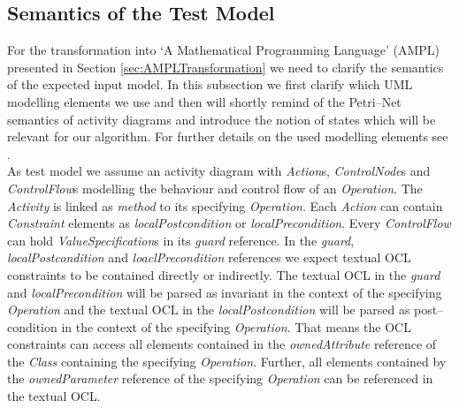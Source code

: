 \documentclass[runningheads,a4paper]{llncs}%
\newcommand{\UMLType}[1]{\textsf{\textit{#1}}} %
\newcommand{\UMLReference}[1]{\textsf{\textit{#1}}} %
\begin{document}
\subsection{Semantics of the Test Model}%
For the transformation into `A Mathematical Programming Language' (AMPL) presented in Section \ref{sec:AMPLTransformation} we need to clarify the semantics of the expected input model. In this subsection we first clarify which UML modelling elements we use and then will shortly remind of the Petri--Net semantics of activity diagrams and introduce the notion of states which will be relevant for our algorithm. For further details on the used modelling elements see \cite{UML23Superstructure}.\\%
As test model we assume an activity diagram with \UMLType{Action}s, \UMLType{ControlNode}s and \UMLType{ControlFlow}s modelling the behaviour and control flow of an \UMLType{Operation}. The \UMLType{Activity} is linked as \UMLReference{method} to its specifying \UMLType{Operation}. Each \UMLType{Action} can contain %
\UMLType{Constraint} %
elements as \UMLReference{localPostcondition} or \UMLReference{localPrecondition}. Every \UMLType{ControlFlow} can hold %
\UMLType{ValueSpecification}s%
in its \UMLReference{guard} reference. In the \UMLReference{guard}, \UMLReference{localPostcondition} and \UMLReference{loaclPrecondition} references we expect textual OCL constraints to be contained directly or indirectly. The textual OCL in the \UMLReference{guard} and \UMLReference{localPrecondition} will be parsed as invariant in the context of the specifying \UMLType{Operation} and the textual OCL in the \UMLReference{localPostcondition} will be parsed as post--condition in the context of the specifying \UMLType{Operation}. That means the OCL constraints can access all elements contained in the \UMLReference{ownedAttribute} reference %
of the \UMLType{Class} containing the specifying \UMLType{Operation}. Further, all elements contained by the \UMLReference{ownedParameter} reference of the specifying \UMLType{Operation} can be referenced in the textual OCL.\\%
\end{document}
